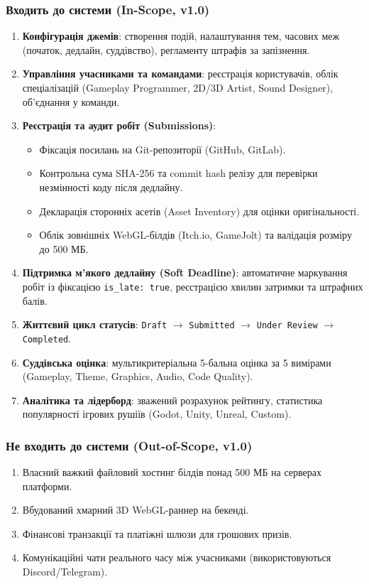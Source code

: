 \documentclass[12pt,a4paper]{article}
\begin{document}
\subsubsection{Входить до системи (In-Scope, v1.0)}
\begin{enumerate}
    \item \textbf{Конфігурація джемів}: створення подій, налаштування тем, часових меж (початок, дедлайн, суддівство), регламенту штрафів за запізнення.
    \item \textbf{Управління учасниками та командами}: реєстрація користувачів, облік спеціалізацій (Gameplay Programmer, 2D/3D Artist, Sound Designer), об'єднання у команди.
    \item \textbf{Реєстрація та аудит робіт (Submissions)}:
    \begin{itemize}
        \item Фіксація посилань на Git-репозиторії (GitHub, GitLab).
        \item Контрольна сума SHA-256 та commit hash релізу для перевірки незмінності коду після дедлайну.
        \item Декларація сторонніх асетів (Asset Inventory) для оцінки оригінальності.
        \item Облік зовнішніх WebGL-білдів (Itch.io, GameJolt) та валідація розміру до 500 МБ.
    \end{itemize}
    \item \textbf{Підтримка м'якого дедлайну (Soft Deadline)}: автоматичне маркування робіт із фіксацією \texttt{is\_late: true}, реєстрацією хвилин затримки та штрафних балів.
    \item \textbf{Життєвий цикл статусів}: \texttt{Draft} $\rightarrow$ \texttt{Submitted} $\rightarrow$ \texttt{Under Review} $\rightarrow$ \texttt{Completed}.
    \item \textbf{Суддівська оцінка}: мультикритеріальна 5-бальна оцінка за 5 вимірами (Gameplay, Theme, Graphics, Audio, Code Quality).
    \item \textbf{Аналітика та лідерборд}: зважений розрахунок рейтингу, статистика популярності ігрових рушіїв (Godot, Unity, Unreal, Custom).
\end{enumerate}

\subsubsection{Не входить до системи (Out-of-Scope, v1.0)}
\begin{enumerate}
    \item Власний важкий файловий хостинг білдів понад 500 МБ на серверах платформи.
    \item Вбудований хмарний 3D WebGL-раннер на бекенді.
    \item Фінансові транзакції та платіжні шлюзи для грошових призів.
    \item Комунікаційні чати реального часу між учасниками (використовуються Discord/Telegram).
\end{enumerate}
\end{document}
